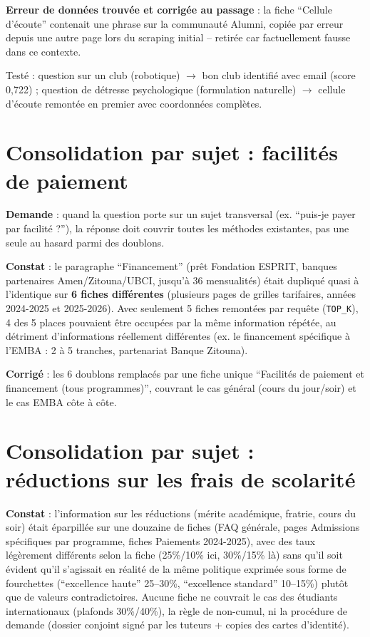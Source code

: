 \documentclass[11pt,a4paper]{report}
\begin{document}
\begin{noteinfo}
\textbf{Erreur de données trouvée et corrigée au passage} : la fiche ``Cellule d'écoute''
contenait une phrase sur la communauté Alumni, copiée par erreur depuis une autre page
lors du scraping initial -- retirée car factuellement fausse dans ce contexte.
\end{noteinfo}

Testé : question sur un club (robotique) $\to$ bon club identifié avec email (score
0,722) ; question de détresse psychologique (formulation naturelle) $\to$ cellule
d'écoute remontée en premier avec coordonnées complètes.

\section{Consolidation par sujet : facilités de paiement}
\textbf{Demande} : quand la question porte sur un sujet transversal (ex. ``puis-je payer
par facilité ?''), la réponse doit couvrir toutes les méthodes existantes, pas une seule
au hasard parmi des doublons.

\textbf{Constat} : le paragraphe ``Financement'' (prêt Fondation ESPRIT, banques
partenaires Amen/Zitouna/UBCI, jusqu'à 36 mensualités) était dupliqué quasi à l'identique
sur \textbf{6 fiches différentes} (plusieurs pages de grilles tarifaires, années
2024-2025 et 2025-2026). Avec seulement 5 fiches remontées par requête
(\texttt{TOP\_K}), 4 des 5 places pouvaient être occupées par la même information
répétée, au détriment d'informations réellement différentes (ex. le financement
spécifique à l'EMBA : 2 à 5 tranches, partenariat Banque Zitouna).

\textbf{Corrigé} : les 6 doublons remplacés par une fiche unique ``Facilités de paiement
et financement (tous programmes)'', couvrant le cas général (cours du jour/soir) et le
cas EMBA côte à côte.

\section{Consolidation par sujet : réductions sur les frais de scolarité}
\textbf{Constat} : l'information sur les réductions (mérite académique, fratrie, cours du
soir) était éparpillée sur une douzaine de fiches (FAQ générale, pages Admissions
spécifiques par programme, fiches Paiements 2024-2025), avec des taux légèrement
différents selon la fiche (25\%/10\% ici, 30\%/15\% là) sans qu'il soit évident qu'il
s'agissait en réalité de la même politique exprimée sous forme de fourchettes
(``excellence haute'' 25--30\%, ``excellence standard'' 10--15\%) plutôt que de valeurs
contradictoires. Aucune fiche ne couvrait le cas des étudiants internationaux (plafonds
30\%/40\%), la règle de non-cumul, ni la procédure de demande (dossier conjoint signé par
les tuteurs + copies des cartes d'identité).
\end{document}
